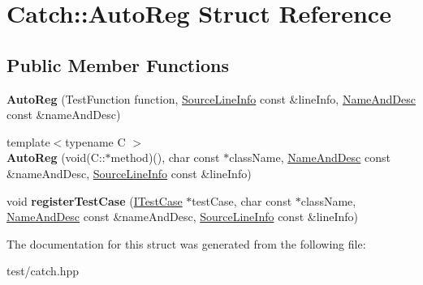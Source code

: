 \hypertarget{structCatch_1_1AutoReg}{}\section{Catch\+:\+:Auto\+Reg Struct Reference}
\label{structCatch_1_1AutoReg}
\subsection*{Public Member Functions}
\begin{DoxyCompactItemize}
\item 
{\bfseries Auto\+Reg} (Test\+Function function, \hyperlink{structCatch_1_1SourceLineInfo}{Source\+Line\+Info} const \&line\+Info, \hyperlink{structCatch_1_1NameAndDesc}{Name\+And\+Desc} const \&name\+And\+Desc)\hypertarget{structCatch_1_1AutoReg_af224f4568d57b8652474df475a164a8c}{}\label{structCatch_1_1AutoReg_af224f4568d57b8652474df475a164a8c}

\item 
{\footnotesize template$<$typename C $>$ }\\{\bfseries Auto\+Reg} (void(C\+::$\ast$method)(), char const $\ast$class\+Name, \hyperlink{structCatch_1_1NameAndDesc}{Name\+And\+Desc} const \&name\+And\+Desc, \hyperlink{structCatch_1_1SourceLineInfo}{Source\+Line\+Info} const \&line\+Info)\hypertarget{structCatch_1_1AutoReg_a1bf9207fe0a02b46dc0ab1cc03cbe738}{}\label{structCatch_1_1AutoReg_a1bf9207fe0a02b46dc0ab1cc03cbe738}

\item 
void {\bfseries register\+Test\+Case} (\hyperlink{structCatch_1_1ITestCase}{I\+Test\+Case} $\ast$test\+Case, char const $\ast$class\+Name, \hyperlink{structCatch_1_1NameAndDesc}{Name\+And\+Desc} const \&name\+And\+Desc, \hyperlink{structCatch_1_1SourceLineInfo}{Source\+Line\+Info} const \&line\+Info)\hypertarget{structCatch_1_1AutoReg_a2dc6a03e838b31e29fcd6a740195b55b}{}\label{structCatch_1_1AutoReg_a2dc6a03e838b31e29fcd6a740195b55b}

\end{DoxyCompactItemize}


The documentation for this struct was generated from the following file\+:\begin{DoxyCompactItemize}
\item 
test/catch.\+hpp\end{DoxyCompactItemize}
